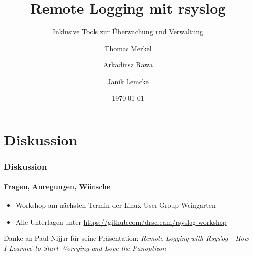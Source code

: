 \documentclass[12pt,a4paper]{beamer}
\title{Remote Logging mit rsyslog}
\subtitle{Inklusive Tools zur Überwachung und Verwaltung}
\author{Thomas Merkel \and Arkadiusz Rawa \and Janik Lemcke}
\institute{Hochschule Ravensburg-Weingarten}
\date{\today}
\begin{document}
	\begin{frame}
		\titlepage
	\end{frame} 
	\begin{frame}
		\tableofcontents
	\end{frame}
	
	
	
	
	

	\section{Diskussion}
	\begin{frame}
		\frametitle{Diskussion}
		\framesubtitle{Fragen, Anregungen, Wünsche}
		\begin{itemize}
			\item Workshop am nächsten Termin der Linux User Group Weingarten
			\item Alle Unterlagen unter \url{https://github.com/drscream/rsyslog-workshop}		
		\end{itemize}
		\bigskip
		\bigskip
		\scriptsize{
			Danke an Paul Nijjar für seine Präsentation: \linebreak 
			\textit{Remote Logging with Rsyslog - How I Learned to Start Worrying and Love the Panopticon}
		}
	\end{frame}
\end{document}
